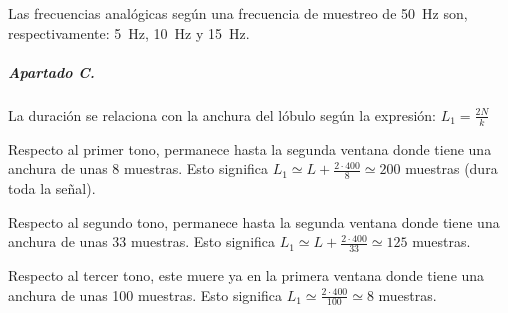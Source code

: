 Las frecuencias analógicas según una frecuencia de muestreo de \SI{50}{\hertz}
son, respectivamente: \SI{5}{\hertz}, \SI{10}{\hertz} y \SI{15}{\hertz}.

\subparagraph{Apartado C.}

La duración se relaciona con la anchura del lóbulo según la expresión:
$L_1 = \frac{2N}{k}$

Respecto al primer tono, permanece hasta la segunda ventana donde tiene una
anchura de unas 8 muestras. Esto significa $L_1 \simeq L + \frac{2\cdot 400}{8}
\simeq 200$ muestras (dura toda la señal).

Respecto al segundo tono, permanece hasta la segunda ventana donde tiene una
anchura de unas 33 muestras. Esto significa $L_1 \simeq L + \frac{2\cdot 400}{33}
\simeq 125$ muestras.

Respecto al tercer tono, este muere ya en la primera ventana donde tiene una
anchura de unas 100 muestras. Esto significa $L_1 \simeq \frac{2\cdot 400}{100}
\simeq 8$ muestras.


\finishpage

